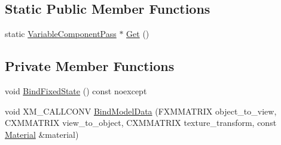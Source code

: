 \subsection*{Static Public Member Functions}
\begin{DoxyCompactItemize}
\item 
static \hyperlink{classmage_1_1_variable_component_pass}{Variable\+Component\+Pass} $\ast$ \hyperlink{classmage_1_1_variable_component_pass_a564365cd8383c82fe94ae017b29dcdd2}{Get} ()
\end{DoxyCompactItemize}
\subsection*{Private Member Functions}
\begin{DoxyCompactItemize}
\item 
void \hyperlink{classmage_1_1_variable_component_pass_ab3c2536fd9633f61309d649d68373813}{Bind\+Fixed\+State} () const noexcept
\item 
void X\+M\+\_\+\+C\+A\+L\+L\+C\+O\+NV \hyperlink{classmage_1_1_variable_component_pass_abdd0f1d409317c650c7d70fe90ef29b1}{Bind\+Model\+Data} (F\+X\+M\+M\+A\+T\+R\+IX object\+\_\+to\+\_\+view, C\+X\+M\+M\+A\+T\+R\+IX view\+\_\+to\+\_\+object, C\+X\+M\+M\+A\+T\+R\+IX texture\+\_\+transform, const \hyperlink{classmage_1_1_material}{Material} \&material)
\end{DoxyCompactItemize}
